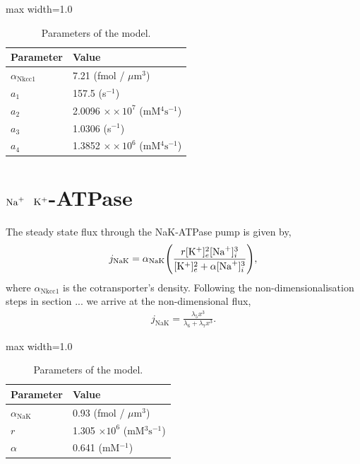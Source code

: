 \documentclass{svjour3}
\newcommand{\kplus}{{\rm K}^+}
\newcommand{\na}{{\rm Na}^+}
\newcommand{\bna}{[{\rm Na}^+]_i}
\begin{document}
\begin{table}[H]
\centering
\captionsetup{justification=centering} 
\caption{Parameters of the model.}
\begin{adjustbox}{max width=1.0\textwidth}
\begin{tabular}{@{}ll@{}}
\toprule
\bf{Parameter}				& \bf{Value}							\\ \midrule
$\alpha_{\text{Nkcc1}}$		& 7.21	 (fmol / $\mu \text{m}^3$)	\\
$a_1$ 						& 157.5	 (s$^{-1}$)					\\	
$a_2$						& 2.0096	$\times×10^7$ (mM$^4 \text{s}^{-1}$)	\\
$a_3$ 						& 1.0306	 (s$^{-1}$)	 				\\
$a_4$ 						& 1.3852	$\times×10^6$ (mM$^4 \text{s}^{-1}$)	\\
\bottomrule
\end{tabular}
\end{adjustbox}
\label{table:Nkcc1}
\end{table}

\section*{\Large $\na$ $\kplus$-ATPase}

The steady state flux through the NaK-ATPase pump is given by,
\begin{align*}
j_{\text{NaK}}=\alpha_{\text{NaK}} \Bigg(\frac{r [\kplus]_e^2 \bna^3}{[\kplus]_e^2 + \alpha \bna^3} \Bigg),
\end{align*}
where $\alpha_{\text{Nkcc1}}$ is the cotransporter's density. Following the non-dimensionalisation steps in section ... we arrive at the non-dimensional flux,
\begin{align}
j_{\text{NaK}}=\frac{\lambda_5 x^3}{\lambda_6 +\lambda_7 x^3}.
\end{align}

\begin{table}[H]
\centering
\captionsetup{justification=centering} 
\caption{Parameters of the model.}
\begin{adjustbox}{max width=1.0\textwidth}
\begin{tabular}{@{}ll@{}}
\toprule
\bf{Parameter}				& \bf{Value}										\\ \midrule
$\alpha_{\text{NaK}}$		& 0.93	(fmol / $\mu \text{m}^3$)				\\
$r$ 							& 1.305 $\times 10^6	$ (mM$^3 \text{s}^{-1}$)		\\	
$\alpha$						& 0.641	(mM$^{-1}$)								\\
\bottomrule
\end{tabular}
\end{adjustbox}
\label{table:NaK}
\end{table}
\end{document}
